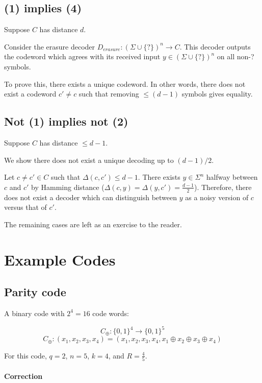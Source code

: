 \documentclass{idc_msc}
\begin{document}
\subsection{(1) implies (4)}

Suppose $C$ has distance $d$.

Consider the erasure decoder $D_{erasure} : (\Sigma \cup \{?\} )^n \to C$.
This decoder outputs the codeword which agrees with its received input $y\in (\Sigma \cup \{?\})^n$ on all non-? symbols.

To prove this, there exists a unique codeword.
In other words, there does not exist a codeword $c' \ne c$ such that removing $\le (d-1)$ symbols gives equality.

\subsection{Not (1) implies not (2)}

Suppose $C$ has distance $\le d-1$.

We show there does not exist a unique decoding up to $(d-1)/2$.

Let $c\ne c' \in C$ such that $\Delta(c, c') \le d-1$.
There exists $y \in \Sigma^n$ halfway between $c$ and $c'$ by Hamming distance ($\Delta(c,y) = \Delta(y,c') = \frac{d-1}{2}$).
Therefore, there does not exist a decoder which can distinguish between $y$ as a noisy version of $c$ versus that of $c'$.

The remaining cases are left as an exercise to the reader.

\section{Example Codes}

\subsection{Parity code}

A binary code with $2^4=16$ code words:

\[ C_\oplus : \{0,1\}^4 \to \{0,1\}^5 \]
\[ C_\oplus : (x_1,x_2,x_3,x_4) = (x_1, x_2, x_3, x_4, x_1 \oplus x_2 \oplus x_3 \oplus x_4) \]

For this code, $q=2$, $n=5$, $k=4$, and $R=\frac{4}{5}$.

\paragraph{Correction}
\end{document}
